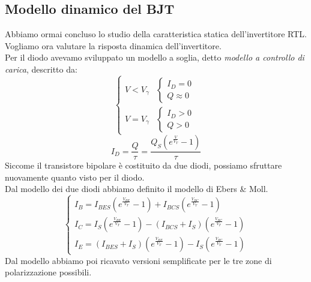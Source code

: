 \documentclass{article}
\numberwithin{equation}{subsection}
\begin{document}
	\subsection{Modello dinamico del BJT}
	Abbiamo ormai concluso lo studio della caratteristica statica dell'invertitore RTL.\\
	Vogliamo ora valutare la risposta dinamica dell'invertitore.\\
	Per il diodo avevamo sviluppato un modello a soglia, detto \textit{modello a controllo di carica}, descritto da:
	\[ \begin{cases} V < V_\gamma & \begin{cases} I_D = 0 \\ Q \approx 0 \end{cases} \\ V = V_\gamma & \begin{cases} I_D > 0 \\ Q > 0 \end{cases} \end{cases} \]
	\[ I_D = \frac{Q}{\tau} = \frac{Q_S \left( e^{\frac{V}{V_T}} - 1 \right)}{\tau} \]
	Siccome il transistore bipolare è costituito da due diodi, possiamo sfruttare nuovamente quanto visto per il diodo.\\
	Dal modello dei due diodi abbiamo definito il modello di Ebers \& Moll.
	\[ \begin{cases} I_B = I_{BES} \left( e^{\frac{V_{BE}}{V_T}} - 1 \right) + I_{BCS} \left( e^{\frac{V_{BC}}{V_T}} - 1 \right) \\ I_C = I_S \left( e^{\frac{V_{BE}}{V_T}} - 1 \right) - (I_{BCS} + I_S) \left( e^{\frac{V_{BC}}{V_T}} - 1 \right) \\ I_E = (I_{BES} + I_S) \left( e^{\frac{V_{BE}}{V_T}} - 1 \right) - I_S \left( e^{\frac{V_{BC}}{V_T}} - 1 \right) \end{cases} \]
	Dal modello abbiamo poi ricavato versioni semplificate per le tre zone di polarizzazione possibili.
\end{document}
